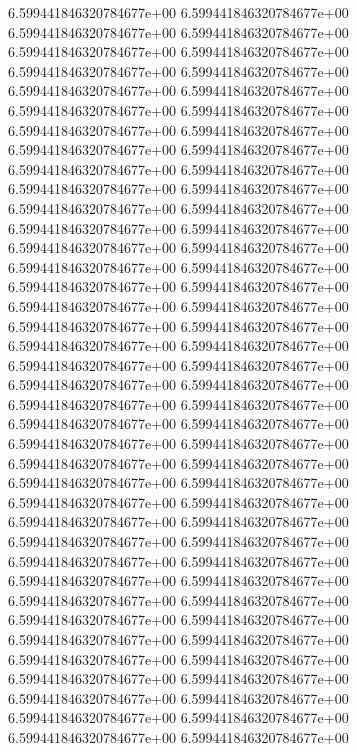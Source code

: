 6.599441846320784677e+00	6.599441846320784677e+00	6.599441846320784677e+00	6.599441846320784677e+00	6.599441846320784677e+00	6.599441846320784677e+00	6.599441846320784677e+00	6.599441846320784677e+00	6.599441846320784677e+00	6.599441846320784677e+00	6.599441846320784677e+00	6.599441846320784677e+00	6.599441846320784677e+00	6.599441846320784677e+00	6.599441846320784677e+00	6.599441846320784677e+00	6.599441846320784677e+00	6.599441846320784677e+00	6.599441846320784677e+00	6.599441846320784677e+00	6.599441846320784677e+00	6.599441846320784677e+00	6.599441846320784677e+00	6.599441846320784677e+00	6.599441846320784677e+00	6.599441846320784677e+00	6.599441846320784677e+00	6.599441846320784677e+00	6.599441846320784677e+00	6.599441846320784677e+00	6.599441846320784677e+00	6.599441846320784677e+00	6.599441846320784677e+00	6.599441846320784677e+00	6.599441846320784677e+00	6.599441846320784677e+00	6.599441846320784677e+00	6.599441846320784677e+00	6.599441846320784677e+00	6.599441846320784677e+00	6.599441846320784677e+00	6.599441846320784677e+00	6.599441846320784677e+00	6.599441846320784677e+00	6.599441846320784677e+00	6.599441846320784677e+00	6.599441846320784677e+00	6.599441846320784677e+00	6.599441846320784677e+00	6.599441846320784677e+00	6.599441846320784677e+00	6.599441846320784677e+00	6.599441846320784677e+00	6.599441846320784677e+00	6.599441846320784677e+00	6.599441846320784677e+00	6.599441846320784677e+00	6.599441846320784677e+00	6.599441846320784677e+00	6.599441846320784677e+00	6.599441846320784677e+00	6.599441846320784677e+00	6.599441846320784677e+00	6.599441846320784677e+00	6.599441846320784677e+00	6.599441846320784677e+00	6.599441846320784677e+00	6.599441846320784677e+00	6.599441846320784677e+00	6.599441846320784677e+00	6.599441846320784677e+00	6.599441846320784677e+00	6.599441846320784677e+00	6.599441846320784677e+00	6.599441846320784677e+00	6.599441846320784677e+00
